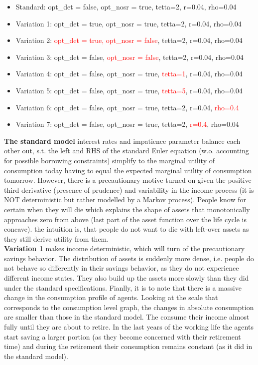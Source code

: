 \documentclass[12pt,a4paper]{article}
\begin{document}
\begin{itemize}
    \item Standard: opt\_det = false, opt\_nosr = true, tetta=2, r=0.04, rho=0.04
    \item Variation 1: opt\_det = true, opt\_nosr = true, tetta=2, r=0.04, rho=0.04
    \item Variation 2: \textcolor{red}{opt\_det = true, opt\_nosr = false}, tetta=2, r=0.04, rho=0.04
    \item Variation 3: opt\_det = false, \textcolor{red}{opt\_nosr = false}, tetta=2, r=0.04, rho=0.04
    \item Variation 4: opt\_det = false, opt\_nosr = true, \textcolor{red}{tetta=1}, r=0.04, rho=0.04
    \item Variation 5: opt\_det = false, opt\_nosr = true, \textcolor{red}{tetta=5}, r=0.04, rho=0.04
    \item Variation 6: opt\_det = false, opt\_nosr = true, tetta=2, r=0.04, \textcolor{red}{rho=0.4}
    \item Variation 7: opt\_det = false, opt\_nosr = true, tetta=2, \textcolor{red}{r=0.4}, rho=0.04
\end{itemize}

\textbf{The standard model} interest rates and impatience parameter balance each other out, s.t. the left and RHS of the standard Euler equation (w.o. accounting for possible borrowing constraints) simplify to the marginal utility of consumption today having to equal the expected marginal utility of consumption tomorrow. However, there is a precautionary motive turned on given the positive third derivative (presence of prudence) and variability in the income process (it is NOT deterministic but rather modelled by a Markov process). People know for certain when they will die which explains the shape of assets that monotonically approaches zero from above (last part of the asset function over the life cycle is concave). the intuition is, that people do not want to die with left-over assets as they still derive utility from them. \\

\textbf{Variation 1} makes income deterministic, which will turn of the precautionary savings behavior. The distribution of assets is suddenly more dense, i.e. people do not behave so differently in their savings behavior, as they do not experience different income states. They also build up the assets more slowly than they did under the standard specifications. Fianlly, it is to note that there is a massive change in the consumption profile of agents. Looking at the scale that corresponds to the consumption level graph, the changes in absolute consumption are smaller than those in the standard model. The consume their income almost fully until they are about to retire. In the last years of the working life the agents start saving a larger portion (as they become concerned with their retirement time) and during the retirement their consumption remains constant (as it did in the standard model). \\
\end{document}
